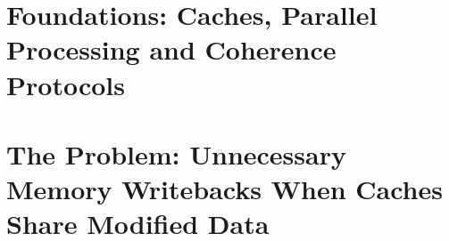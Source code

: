 \documentclass[11pt,a4paper,oneside]{report}
\begin{document}
\clearpage
\tableofcontents
\clearpage
\listoffigures
\clearpage
\listoftables

\cleardoublepage
{}



\part{Foundations: Caches, Parallel Processing and Coherence Protocols}
\label{part:foundations}







\part{The Problem: Unnecessary Memory Writebacks When Caches Share Modified Data}
\label{part:problem}












\clearpage
\appendix

\clearpage
\glsaddall
\printnoidxglossary[title={Glossary}, sort=word]

\cleardoublepage
{}
{}



\clearpage
\printindex
\end{document}
